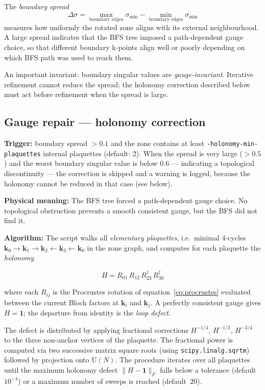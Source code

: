 \documentclass[a4paper,12pt]{report}
\begin{document}
The \emph{boundary spread}
\begin{equation}
  \Delta\sigma = \max_{\text{boundary edges}}\sigma_{\min} -
                 \min_{\text{boundary edges}}\sigma_{\min}
\end{equation}
measures how uniformly the rotated zone aligns with its external neighbourhood.
A large spread indicates that the BFS tree imposed a path-dependent gauge
choice, so that different boundary k-points align well or poorly depending on
which BFS path was used to reach them.

An important invariant: boundary singular values are \emph{gauge-invariant}.
Iterative refinement cannot reduce the spread; the holonomy correction
described below must act before refinement when the spread is large.


\subsection*{Gauge repair --- holonomy correction}

\textbf{Trigger:} boundary spread $> 0.1$ and the zone contains at least
\texttt{-holonomy-\allowbreak min-\allowbreak plaquettes} internal plaquettes (default: 2).
When the spread is very large ($> 0.5$) and the worst boundary singular value
is below 0.6 --- indicating a topological discontinuity --- the correction is
skipped and a warning is logged, because the holonomy cannot be reduced in
that case (see below).

\textbf{Physical meaning:} The BFS tree forced a path-dependent gauge choice.
No topological obstruction prevents a smooth consistent gauge, but the BFS
did not find it.

\textbf{Algorithm:} The script walks all \emph{elementary plaquettes},
i.e.\ minimal 4-cycles $\pmb{k}_0 \to \pmb{k}_1 \to \pmb{k}_2 \leftarrow
\pmb{k}_3 \leftarrow \pmb{k}_0$ in the zone graph, and computes for each
plaquette the \emph{holonomy}

\begin{equation}
  H = R_{01}\, R_{12}\, R_{23}^{\dagger}\, R_{30}^{\dagger}
\end{equation}

where each $R_{ij}$ is the Procrustes rotation of equation~\eqref{eq:procrustes}
evaluated between the current Bloch factors at $\pmb{k}_i$ and $\pmb{k}_j$.
A perfectly consistent gauge gives $H = \mathbf{1}$; the departure from
identity is the \emph{loop defect}.

The defect is distributed by applying fractional corrections
$H^{-1/4}$, $H^{-1/2}$, $H^{-3/4}$ to the three non-anchor vertices of the
plaquette.
The fractional power is computed via two successive matrix square roots
(using \texttt{scipy.linalg.sqrtm}) followed by projection onto
$\mathrm{U}(N)$.
The procedure iterates over all plaquettes until the maximum holonomy defect
$\|H - \mathbf{1}\|_F$ falls below a tolerance (default~$10^{-4}$) or a
maximum number of sweeps is reached (default~$20$).
\end{document}
